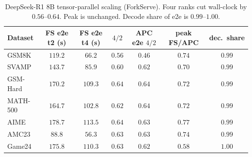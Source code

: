 \documentclass[11pt,a4paper]{article}
\begin{document}
\begin{table}[h]
\centering
\small
{}
\caption{DeepSeek-R1 8B fan-out and winner decode tokens.
Fan-out is $1.2$--$1.7\times$ APC and still $<1\%$ of $T_{\mathrm{e2e}}$ ($4.0$ vs.\ $6.0\,\mathrm{s}$ summed at $\mathrm{tp}{=}2$).
APC always records the decode budget; ForkServe stops early except on AIME ($\approx 1990$ tokens/item).}
\end{table}

\begin{table}[h]
\centering
\small
\begin{tabular}{@{}lcccccc@{}}
\toprule
Dataset & FS e2e t2 (s) & FS e2e t4 (s) & $4/2$ & APC e2e $4/2$ & peak FS/APC & dec.\ share \\
\midrule
GSM8K    & $119.2$ & $66.2$ & $0.56$ & $0.46$ & $0.74$ & $0.99$ \\
SVAMP    & $143.7$ & $85.9$ & $0.60$ & $0.62$ & $0.70$ & $0.99$ \\
GSM-Hard & $170.2$ & $109.3$ & $0.64$ & $0.64$ & $0.72$ & $0.99$ \\
MATH-500 & $164.7$ & $102.8$ & $0.62$ & $0.64$ & $0.72$ & $0.99$ \\
AIME     & $178.7$ & $113.5$ & $0.64$ & $0.63$ & $0.77$ & $0.99$ \\
AMC23    & $88.8$ & $56.3$ & $0.63$ & $0.63$ & $0.74$ & $0.99$ \\
Game24   & $175.8$ & $110.3$ & $0.63$ & $0.62$ & $0.58$ & $1.00$ \\
\bottomrule
\end{tabular}
\caption{DeepSeek-R1 8B tensor-parallel scaling (ForkServe).
Four ranks cut wall-clock by $0.56$--$0.64$.
Peak is unchanged.
Decode share of e2e is $0.99$--$1.00$.}
\end{table}
\end{document}
